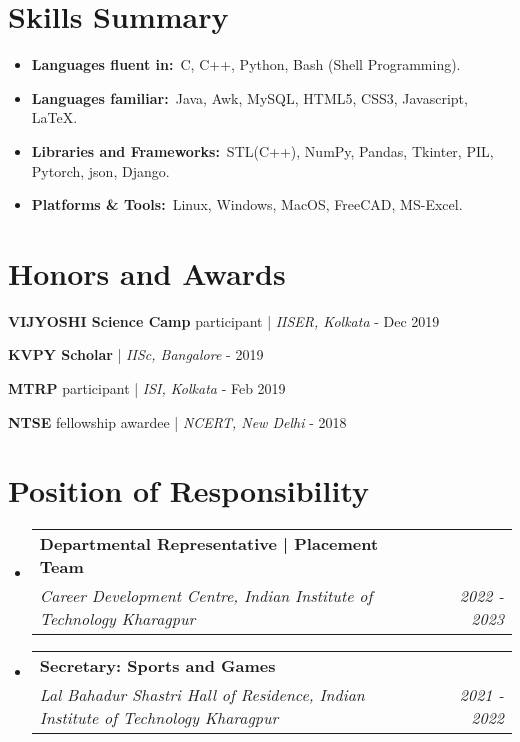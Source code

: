 \documentclass[a4paper,20pt]{article}
\makeatletter
\newcommand{\resumeItem}[2]{
  \item\small{
    \textbf{#1}{#2 \vspace{-2pt}}
  }
}
\newcommand{\resumeSubheading}[4]{
  \vspace{-1pt}\item
    \begin{tabular*}{0.97\textwidth}{l@{\extracolsep{\fill}}r}
      \textbf{#1} & #2 \\
      \textit{#3} & \textit{#4} \\
    \end{tabular*}\vspace{-5pt}
}
\newcommand{\resumeSubItem}[2]{\resumeItem{#1}{#2}\vspace{-5pt}}
\newcommand{\resumeSubHeadingListStart}{\begin{itemize}[leftmargin=*]}
\newcommand{\resumeSubHeadingListEnd}{\end{itemize}}
\makeatother
\begin{document}
\section{Skills Summary}
\resumeSubHeadingListStart
\resumeSubItem{Languages fluent in:}{~C, C++, Python, Bash (Shell Programming).}
\resumeSubItem{Languages familiar:}{~Java, Awk, MySQL, HTML5, CSS3, Javascript, LaTeX.}
\resumeSubItem{Libraries and Frameworks:}{~STL(C++), NumPy, Pandas, Tkinter, PIL, Pytorch, json, Django.}
\resumeSubItem{Platforms \& Tools:}{~Linux, Windows, MacOS, FreeCAD, MS-Excel.}
\resumeSubHeadingListEnd

\vspace{0pt}
\vspace{0pt}
\section{Honors and Awards}
\begin{description}[font=$\bullet$]
\item {\textbf{VIJYOSHI Science Camp} participant | \emph{IISER, Kolkata} - Dec 2019 }
\vspace{-3pt}
\item {\textbf{KVPY Scholar} | \emph{IISc, Bangalore} - 2019 }
\vspace{-3pt}
\item {\textbf{MTRP} participant | \emph{ISI, Kolkata} - Feb 2019}
\vspace{-3pt}
\item {\textbf{NTSE} fellowship awardee | \emph{NCERT, New Delhi} - 2018}

\end{description}

\vspace{0pt}
\section{Position of Responsibility}
  \resumeSubHeadingListStart
    \resumeSubheading
    {Departmental Representative | Placement Team}{}
    {Career Development Centre, Indian Institute of Technology Kharagpur}{2022 - 2023}
\resumeSubheading
    {Secretary: Sports and Games}{}
    {Lal Bahadur Shastri Hall of Residence, Indian Institute of Technology Kharagpur}{2021 - 2022}
\resumeSubHeadingListEnd
\vspace{5pt}

\end{document}
